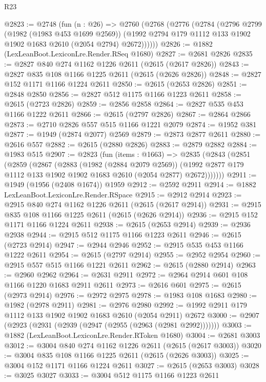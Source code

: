 \begin{lexlean}{R23}
\begin{coremodule}
@2823 := @2748
    (fun (n : @26) =>
    @2760
      (@2768
        (@2776
          (@2784
            (@2796
              @2799
              (@1982 (@1983 @453 @1699 @2569))
              (@1992 @2794 @179 @1112 @133 @1902 @1902 @1683 @2610 (@2054 @2794) @2672))))))
@2826 := @1882 (LexLeanBoot.LexiconLre.Render.RSeq @1680)
@2827 := @2681 @2826
@2835 := @2827 @840 @274 @1162 @1226 @2611 (@2615 (@2617 @2826))
@2843 := @2827 @835 @108 @1166 @1225 @2611 (@2615 (@2626 @2826))
@2848 := @2827 @152 @1171 @1166 @1224 @2611
@2850 := @2615 (@2653 @2826)
@2851 := @2848 @2850
@2856 := @2827 @512 @1175 @1166 @1223 @2611
@2858 := @2615 (@2723 @2826)
@2859 := @2856 @2858
@2864 := @2827 @535 @453 @1166 @1222 @2611
@2866 := @2615 (@2797 @2826)
@2867 := @2864 @2866
@2873 := @2710 @2826 @557 @515 @1166 @1221 @2079
@2874 := @1952 @381
@2877 := @1949 (@2874 @2077) @2569
@2879 := @2873 @2877 @2611
@2880 := @2616 @557
@2882 := @2615 (@2880 @2826)
@2883 := @2879 @2882
@2884 := @1983 @515
@2907 := @2823
    (fun (items : @1663) =>
    @2835
      (@2843
        (@2851
          (@2859
            (@2867
              (@2883
                (@1982 (@2884 @2079 @2569))
                (@1992 @2877 @179 @1112 @133 @1902 @1902 @1683 @2610 (@2054 @2877) @2672)))))))
@2911 := @1949 (@1956 (@2408 @1674)) @1959
@2912 := @2592 @2911
@2914 := @1882 LexLeanBoot.LexiconLre.Render.RSpace
@2915 := @2912 @2914
@2923 := @2915 @840 @274 @1162 @1226 @2611 (@2615 (@2617 @2914))
@2931 := @2915 @835 @108 @1166 @1225 @2611 (@2615 (@2626 @2914))
@2936 := @2915 @152 @1171 @1166 @1224 @2611
@2938 := @2615 (@2653 @2914)
@2939 := @2936 @2938
@2944 := @2915 @512 @1175 @1166 @1223 @2611
@2946 := @2615 (@2723 @2914)
@2947 := @2944 @2946
@2952 := @2915 @535 @453 @1166 @1222 @2611
@2954 := @2615 (@2797 @2914)
@2955 := @2952 @2954
@2960 := @2915 @557 @515 @1166 @1221 @2611
@2962 := @2615 (@2880 @2914)
@2963 := @2960 @2962
@2964 := @2631 @2911
@2972 := @2964 @2914 @601 @108 @1166 @1220 @1683 @2911 @2611
@2973 := @2616 @601
@2975 := @2615 (@2973 @2914)
@2976 := @2972 @2975
@2978 := @1983 @108 @1683
@2980 := @1982 (@2978 @2911)
@2981 := @2976 @2980
@2992 := @1992 @2911 @179 @1112 @133 @1902 @1902 @1683 @2610 (@2054 @2911) @2672
@3000 := @2907 (@2923 (@2931 (@2939 (@2947 (@2955 (@2963 (@2981 @2992)))))))
@3003 := @1882 (LexLeanBoot.LexiconLre.Render.RToken @1680)
@3004 := @2681 @3003
@3012 := @3004 @840 @274 @1162 @1226 @2611 (@2615 (@2617 @3003))
@3020 := @3004 @835 @108 @1166 @1225 @2611 (@2615 (@2626 @3003))
@3025 := @3004 @152 @1171 @1166 @1224 @2611
@3027 := @2615 (@2653 @3003)
@3028 := @3025 @3027
@3033 := @3004 @512 @1175 @1166 @1223 @2611

\end{coremodule}
\end{lexlean}
